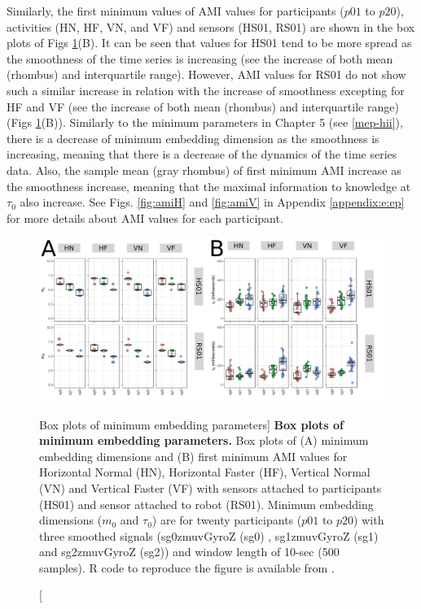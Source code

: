 Similarly, the first minimum values of AMI values 
for participants ($p01$ to $p20$), activities (HN, HF, VN, and VF) and 
sensors (HS01, RS01) are shown in the box plots of 
Figs \ref{fig:CAOAMI-hhi}(B).
It can be seen that values for HS01 tend to be more spread as the smoothness 
of the time series is increasing 
(see the increase of both mean (rhombus) and interquartile range).
However, AMI values for RS01 do not show such a similar increase in relation with
the increase of smoothness excepting for HF and VF
(see the increase of both mean (rhombus) and interquartile range) 
(Figs \ref{fig:CAOAMI-hhi}(B)).
Similarly to the minimum parameters in Chapter 5 (see \ref{mep-hii}),
there is a decrease of minimum embedding dimension as the smoothness 
is increasing, meaning that there is a decrease of the dynamics of 
the time series data. Also, the sample mean (gray rhombus) 
of first minimum AMI increase as the smoothness increase,
meaning that the maximal information to knowledge at $\tau_0$ 
also increase.
See Figs. \ref{fig:amiH} and \ref{fig:amiV} in Appendix \ref{appendix:e:ep} 
for more details about AMI values for each participant.
\begin{figure}
\centering
\includegraphics[width=1.0\textwidth]{fig_6_03}
	\caption
	[Box plots of minimum embedding parameters]{
	{\bf Box plots of minimum embedding parameters.} 
		Box plots of (A) minimum embedding dimensions 
		and (B) first minimum AMI values for 
		Horizontal Normal (HN), Horizontal Faster (HF),
		Vertical Normal (VN) and Vertical Faster (VF)
		with sensors attached to participants (HS01) and
		sensor attached to robot (RS01).
		Minimum embedding dimensions 
		($m_0$ and $\tau_0$)
		are for twenty participants 
		($p01$ to $p20$) with three smoothed signals 
		(sg0zmuvGyroZ (sg0) , sg1zmuvGyroZ (sg1) and sg2zmuvGyroZ (sg2))
		and window length of 10-sec (500 samples).
		R code to reproduce the figure is available 
		from \cite{xochicale2018}.
        }
    \label{fig:CAOAMI-hhi}
\end{figure}

